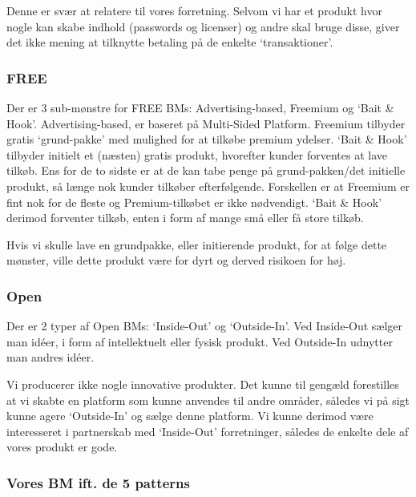 Denne er svær at relatere til vores forretning.
Selvom vi har et produkt hvor nogle kan skabe indhold (passwords og licenser) og andre skal bruge disse, giver det ikke mening at tilknytte betaling på de enkelte `transaktioner'.

\subsubsection{FREE}
Der er 3 sub-mønstre for FREE BMs: Advertising-based, Freemium og `Bait \& Hook'.
Advertising-based, er baseret på Multi-Sided Platform.
Freemium tilbyder gratis `grund-pakke' med mulighed for at tilkøbe premium ydelser.
`Bait \& Hook' tilbyder initielt et (næsten) gratis produkt, hvorefter kunder forventes at lave tilkøb.
Ens for de to sidste er at de kan tabe penge på grund-pakken/det initielle produkt, så længe nok kunder tilkøber efterfølgende.
Forskellen er at Freemium er fint nok for de fleste og Premium-tilkøbet er ikke nødvendigt.
`Bait \& Hook' derimod forventer tilkøb, enten i form af mange små eller få store tilkøb.

Hvis vi skulle lave en grundpakke, eller initierende produkt, for at følge dette mønster, ville dette produkt være for dyrt og derved risikoen for høj.

\subsubsection{Open}
Der er 2 typer af Open BMs: `Inside-Out' og `Outside-In'.
Ved Inside-Out sælger man idéer, i form af intellektuelt eller fysisk produkt.
Ved Outside-In udnytter man andres idéer.

Vi producerer ikke nogle innovative produkter.
Det kunne til gengæld forestilles at vi skabte en platform som kunne anvendes til andre områder, således vi på sigt kunne agere `Outside-In' og sælge denne platform.
Vi kunne derimod være interesseret i partnerskab med `Inside-Out' forretninger, således de enkelte dele af vores produkt er gode.

\subsubsection{Vores BM ift. de 5 patterns}
